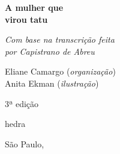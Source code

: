 




\begingroup\thispagestyle{empty}\vspace*{.05\textheight} 

              {\formular
              \huge
              \noindent
              \textbf{A mulher que\\ 
              virou tatu}\\
              
              \vspace{-0.5cm}
              
              }

              \vspace{0.5cm}

              \noindent{}\textit{Com base na transcrição feita\\ por Capistrano de Abreu}              

              \vfill              

              {\small
              \noindent{}Eliane Camargo (\textit{organização})\vspace{0.2cm}\\
              \noindent{}Anita Ekman (\textit{ilustração})
              }

              \vspace{0.5cm}

              {\small\noindent{}3ª edição}

              \vfill
              
              \newfontfamily{}
              {\noindent\fontsize{30}{40}\selectfont\timesnewroman hedra}

              {\small\timesnewroman\noindent São Paulo, \the\year}

\endgroup
\pagebreak
